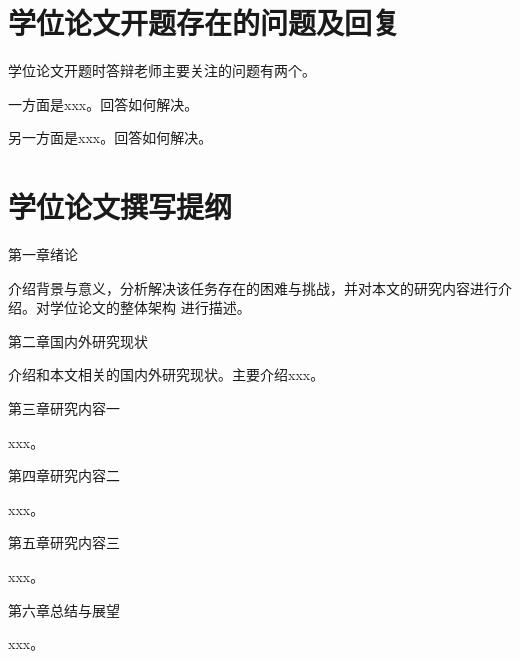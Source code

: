 \chapter{学位论文开题存在的问题及回复}
学位论文开题时答辩老师主要关注的问题有两个。

一方面是xxx。回答如何解决。

另一方面是xxx。回答如何解决。

\chapter{学位论文撰写提纲}
\noindent 第一章\quad 绪论

介绍背景与意义，分析解决该任务存在的困难与挑战，并对本文的研究内容进行介绍。对学位论文的整体架构
进行描述。
\newline

\noindent 第二章\quad 国内外研究现状

介绍和本文相关的国内外研究现状。主要介绍xxx。
\newline

\noindent 第三章\quad 研究内容一

xxx。
\newline

\noindent 第四章\quad 研究内容二

xxx。
\newline

\noindent 第五章\quad 研究内容三

xxx。
\newline

\noindent 第六章\quad 总结与展望

xxx。